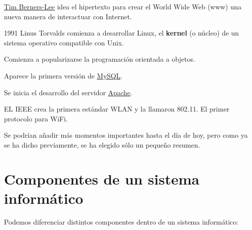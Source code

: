 \begin{description}
    \item[1990] \href{https://es.wikipedia.org/wiki/Tim_Berners-Lee}{Tim Berners-Lee} idea el hipertexto para crear el World Wide Web (www) una nueva manera de interactuar con Internet.

    \begin{minipage}{0.8\linewidth}
        \item[1991] Linus Torvalds comienza a desarrollar Linux, el \textbf{kernel} (o núcleo) de un sistema operativo compatible con Unix.
    \end{minipage}
    \hfill
    \begin{minipage}{0.1\linewidth}
        \hfill
        
    \end{minipage}

    \item[1991] Comienza a popularizarse la programación orientada a objetos.

    \item[1995] Aparece la primera versión de \href{https://es.wikipedia.org/wiki/MySQL}{MySQL}.

    \item[1995] Se inicia el desarrollo del servidor \href{https://es.wikipedia.org/wiki/Servidor_HTTP_Apache}{Apache}.

    \item[1997] EL IEEE crea la primera estándar WLAN y la llamaron 802.11. El primer protocolo para WiFi.

\end{description}

Se podrían añadir más momentos importantes hasta el día de hoy, pero como ya se ha dicho previamente, se ha elegido sólo un pequeño resumen.

\section{Componentes de un sistema informático}

Podemos diferenciar distintos componentes dentro de un sistema informático:

